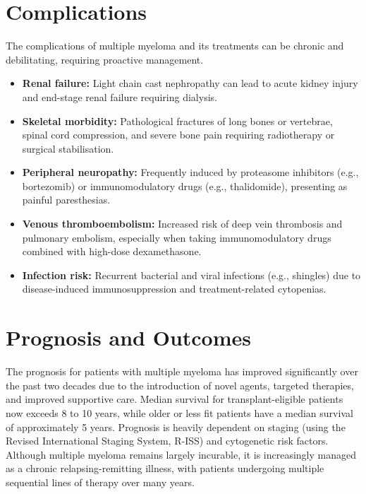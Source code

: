\section*{Complications}
The complications of multiple myeloma and its treatments can be chronic and debilitating, requiring proactive management.
\begin{itemize}
    \item \textbf{Renal failure:} Light chain cast nephropathy can lead to acute kidney injury and end-stage renal failure requiring dialysis.
    \item \textbf{Skeletal morbidity:} Pathological fractures of long bones or vertebrae, spinal cord compression, and severe bone pain requiring radiotherapy or surgical stabilisation.
    \item \textbf{Peripheral neuropathy:} Frequently induced by proteasome inhibitors (e.g., bortezomib) or immunomodulatory drugs (e.g., thalidomide), presenting as painful paresthesias.
    \item \textbf{Venous thromboembolism:} Increased risk of deep vein thrombosis and pulmonary embolism, especially when taking immunomodulatory drugs combined with high-dose dexamethasone.
    \item \textbf{Infection risk:} Recurrent bacterial and viral infections (e.g., shingles) due to disease-induced immunosuppression and treatment-related cytopenias.
\end{itemize}

\section*{Prognosis and Outcomes}
The prognosis for patients with multiple myeloma has improved significantly over the past two decades due to the introduction of novel agents, targeted therapies, and improved supportive care. Median survival for transplant-eligible patients now exceeds 8 to 10 years, while older or less fit patients have a median survival of approximately 5 years. Prognosis is heavily dependent on staging (using the Revised International Staging System, R-ISS) and cytogenetic risk factors. Although multiple myeloma remains largely incurable, it is increasingly managed as a chronic relapsing-remitting illness, with patients undergoing multiple sequential lines of therapy over many years.

